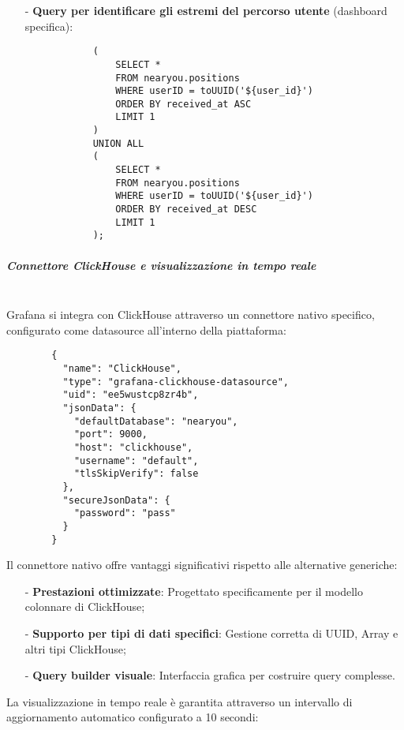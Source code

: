 \documentclass[10pt]{article}
\newcommand{\mysubparagraph}[1]{\subparagraph{#1}\mbox{}\\}
\begin{document}
\begin{itemize}
            \item[-] \textbf{Query per identificare gli estremi del percorso utente} (dashboard specifica):
            \begin{lstlisting}
            (
                SELECT * 
                FROM nearyou.positions 
                WHERE userID = toUUID('${user_id}') 
                ORDER BY received_at ASC 
                LIMIT 1
            )
            UNION ALL
            (
                SELECT * 
                FROM nearyou.positions 
                WHERE userID = toUUID('${user_id}') 
                ORDER BY received_at DESC 
                LIMIT 1
            );
            \end{lstlisting}
        \end{itemize} 

        \mysubparagraph{Connettore ClickHouse e visualizzazione in tempo reale}
        Grafana si integra con ClickHouse attraverso un connettore nativo specifico, configurato come datasource all'interno della piattaforma:
        
        \begin{lstlisting}
        {
          "name": "ClickHouse",
          "type": "grafana-clickhouse-datasource",
          "uid": "ee5wustcp8zr4b",
          "jsonData": {
            "defaultDatabase": "nearyou",
            "port": 9000,
            "host": "clickhouse",
            "username": "default",
            "tlsSkipVerify": false
          },
          "secureJsonData": {
            "password": "pass"
          }
        }
        \end{lstlisting}
        
        Il connettore nativo offre vantaggi significativi rispetto alle alternative generiche:
        
        \begin{itemize}
            \item[-] \textbf{Prestazioni ottimizzate}: Progettato specificamente per il modello colonnare di ClickHouse;
            \item[-] \textbf{Supporto per tipi di dati specifici}: Gestione corretta di UUID, Array e altri tipi ClickHouse;
            \item[-] \textbf{Query builder visuale}: Interfaccia grafica per costruire query complesse.
        \end{itemize}
        
        La visualizzazione in tempo reale è garantita attraverso un intervallo di aggiornamento automatico configurato a 10 secondi:
        
\end{document}
